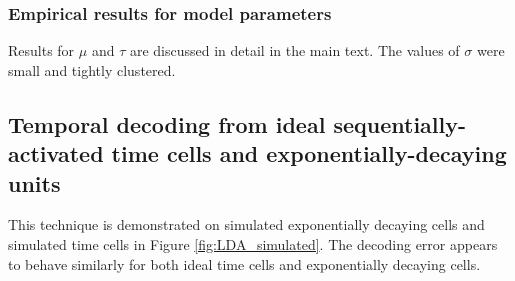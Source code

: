 \documentclass{apa}
\begin{document}
\subsubsection{Empirical results for model parameters}
Results for $\mu$ and $\tau$ are discussed in detail in the main text.  The values
of $\sigma$ were small and tightly clustered.  



\subsection{Temporal decoding from ideal sequentially-activated time cells and
exponentially-decaying units}

This technique is demonstrated on
simulated exponentially decaying cells and simulated time cells in Figure
\ref{fig:LDA_simulated}.  The decoding error appears to behave similarly for
both ideal time cells and exponentially decaying cells. 
\end{document}
